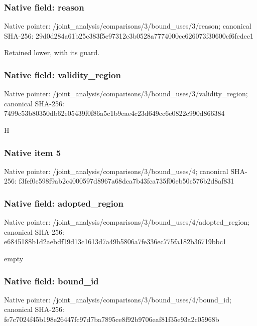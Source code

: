 \documentclass[10pt,a4paper]{article}
\begin{document}
\subsubsection{Native field: reason}
Native pointer: /joint\_\allowbreak{}analysis/comparisons/3/bound\_\allowbreak{}uses/3/reason; canonical SHA-256: 29d0d284a61b25c383f5e97312e3b0528a7774000cc626073f30600cf6fedec1

\begingroup\raggedright\sloppy Retained lower,\allowbreak{} with its guard.\par\endgroup

\subsubsection{Native field: validity\_\allowbreak{}region}
Native pointer: /joint\_\allowbreak{}analysis/comparisons/3/bound\_\allowbreak{}uses/3/validity\_\allowbreak{}region; canonical SHA-256: 7499c53b80350db62e05439f0f86a5c1b9eae4c23d649cc6e0822c990d866384

\begingroup\raggedright\sloppy H\par\endgroup

\subsubsection{Native item 5}
Native pointer: /joint\_\allowbreak{}analysis/comparisons/3/bound\_\allowbreak{}uses/4; canonical SHA-256: f3fef0c598f9ab2c4000597d8967a68dca7b43fca735f06eb50c576b2d8af831

\subsubsection{Native field: adopted\_\allowbreak{}region}
Native pointer: /joint\_\allowbreak{}analysis/comparisons/3/bound\_\allowbreak{}uses/4/adopted\_\allowbreak{}region; canonical SHA-256: e6845188b1d2aebdf19d13c1613d7a49b5806a7fe336ec775fa182b36719bbc1

\begingroup\raggedright\sloppy empty\par\endgroup

\subsubsection{Native field: bound\_\allowbreak{}id}
Native pointer: /joint\_\allowbreak{}analysis/comparisons/3/bound\_\allowbreak{}uses/4/bound\_\allowbreak{}id; canonical SHA-256: fe7c7024f45b198e26447fc97d7ba7895ce8f92b9706eaf81f35e93a2c05968b
\end{document}

